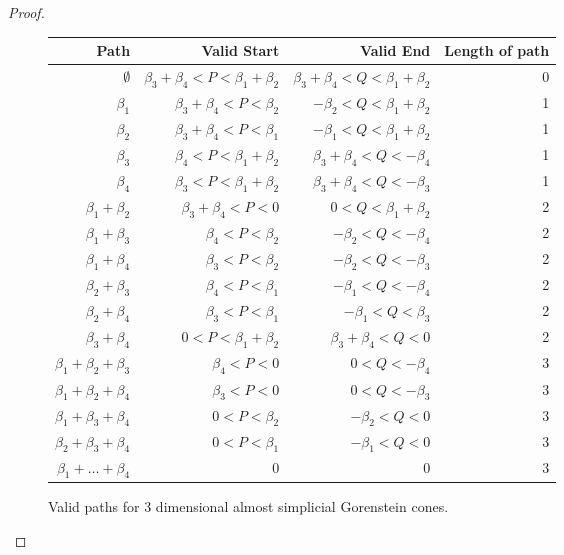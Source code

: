 \documentclass[reqno, 12pt]{amsart}
\theoremstyle{definition}
\numberwithin{equation}{section}
\begin{document}
\begin{proof}
\begin{figure}[ht!]
   \begin{tabular}{|r|r|r|r|}
     \hline
          Path & Valid Start & Valid End & Length of path \\ \hline
          $\emptyset$ & $\beta_3+\beta_4<P<\beta_1+\beta_2$ & $\beta_3+\beta_4<Q<\beta_1+\beta_2$ & 0 \\ \hline
          $\beta_1$ & $\beta_3+\beta_4<P<\beta_2$ & $-\beta_2<Q<\beta_1+\beta_2$& 1 \\ \hline
          $\beta_2$ & $\beta_3+\beta_4<P<\beta_1$& $-\beta_1<Q<\beta_1+\beta_2$& 1\\ \hline
          $\beta_3$ & $\beta_4<P<\beta_1+\beta_2$& $\beta_3+\beta_4<Q<-\beta_4$ & 1 \\ \hline
          $\beta_4$ & $\beta_3<P<\beta_1+\beta_2$ &  $\beta_3+\beta_4<Q<-\beta_3$& 1\\ \hline
          $\beta_1+\beta_2$ & $\beta_3+\beta_4<P<0$ & $0<Q<\beta_1+\beta_2$ & 2\\ \hline
          $\beta_1+\beta_3$ &  $\beta_4<P<\beta_2$&  $-\beta_2<Q<-\beta_4$& 2\\ \hline
          $\beta_1+\beta_4$ & $\beta_3<P<\beta_2$&  $-\beta_2<Q<-\beta_3$& 2\\ \hline
          $\beta_2+\beta_3$ & $\beta_4<P<\beta_1$ & $-\beta_1<Q<-\beta_4$ & 2\\ \hline
          $\beta_2+\beta_4$ & $\beta_3<P<\beta_1$& $-\beta_1<Q<\beta_3$& 2\\ \hline
          $\beta_3+\beta_4$ & $0<P<\beta_1+\beta_2$&$\beta_3+\beta_4<Q<0$ & 2\\ \hline
          $\beta_1+\beta_2+\beta_3$ & $\beta_4<P<0$ & $0<Q<-\beta_4$ & 3\\ \hline
          $\beta_1+\beta_2+\beta_4$ & $\beta_3<P<0$ & $0<Q<-\beta_3$& 3\\ \hline
          $\beta_1+\beta_3+\beta_4$ & $0<P<\beta_2$& $-\beta_2<Q<0$ & 3 \\ \hline
          $\beta_2+\beta_3+\beta_4$ & $0<P<\beta_1$& $-\beta_1<Q<0$& 3\\ \hline 
          $\beta_1+\dots+\beta_4$ &0 & 0& 3\\ \hline
   \end{tabular}
   \caption{Valid paths for 3 dimensional almost simplicial Gorenstein cones.}
   \label{Tab:3Dcase}
\end{figure}


\end{proof}
\end{document}
